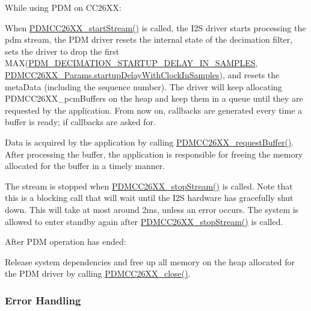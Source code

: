 While using P\+D\+M on C\+C26\+X\+X\+:
\begin{DoxyItemize}
\item When \hyperlink{_p_d_m_c_c26_x_x_8h_af5fafd7c475117bd3ed6783273c2220d}{P\+D\+M\+C\+C26\+X\+X\+\_\+start\+Stream()} is called, the I2\+S driver starts processing the pdm stream, the P\+D\+M driver resets the internal state of the decimation filter, sets the driver to drop the first M\+A\+X(\hyperlink{_p_d_m_c_c26_x_x_8h_ae4d19965c15ec934730399d8213f6bcb}{P\+D\+M\+\_\+\+D\+E\+C\+I\+M\+A\+T\+I\+O\+N\+\_\+\+S\+T\+A\+R\+T\+U\+P\+\_\+\+D\+E\+L\+A\+Y\+\_\+\+I\+N\+\_\+\+S\+A\+M\+P\+L\+E\+S}, \hyperlink{struct_p_d_m_c_c26_x_x___params_a1ffbb2852a48ff157c0f58df4dce4a3b}{P\+D\+M\+C\+C26\+X\+X\+\_\+\+Params.\+startup\+Delay\+With\+Clock\+In\+Samples}), and resets the meta\+Data (including the sequence number). The driver will keep allocating P\+D\+M\+C\+C26\+X\+X\+\_\+pcm\+Buffers on the heap and keep them in a queue until they are requested by the application. From now on, callbacks are generated every time a buffer is ready; if callbacks are asked for.
\item Data is acquired by the application by calling \hyperlink{_p_d_m_c_c26_x_x_8h_a15a0017513c13ca244f7e3a0f5761e8d}{P\+D\+M\+C\+C26\+X\+X\+\_\+request\+Buffer()}. After processing the buffer, the application is responsible for freeing the memory allocated for the buffer in a timely manner.
\item The stream is stopped when \hyperlink{_p_d_m_c_c26_x_x_8h_aebd3b158f38ba1489a56efe5b9a722d2}{P\+D\+M\+C\+C26\+X\+X\+\_\+stop\+Stream()} is called. Note that this is a blocking call that will wait until the I2\+S hardware has gracefully shut down. This will take at most around 2ms, unless an error occurs. The system is allowed to enter standby again after \hyperlink{_p_d_m_c_c26_x_x_8h_aebd3b158f38ba1489a56efe5b9a722d2}{P\+D\+M\+C\+C26\+X\+X\+\_\+stop\+Stream()} is called.
\end{DoxyItemize}

After P\+D\+M operation has ended\+:
\begin{DoxyItemize}
\item Release system dependencies and free up all memory on the heap allocated for the P\+D\+M driver by calling \hyperlink{_p_d_m_c_c26_x_x_8h_afb9597d25d6b2e02f6903bf6652d4371}{P\+D\+M\+C\+C26\+X\+X\+\_\+close()}.
\end{DoxyItemize}

\subsubsection*{Error Handling}

